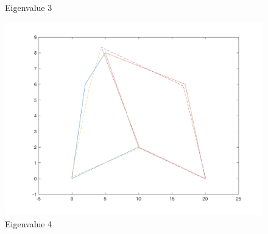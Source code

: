 \documentclass[11pt]{amsart}
\begin{document}
\begin{figure}[H]
\begin{minipage}[b]{0.5\linewidth}
    \caption{Eigenvalue 3} 
    \vspace{4ex}
  \end{minipage}%
  \begin{minipage}[b]{0.5\linewidth}
    \centering
    \includegraphics[width=.5\linewidth]{eigenvectors/eigenvector_4_fullint.png} 
    \caption{Eigenvalue 4} 
    \vspace{4ex}
  \end{minipage} 
\end{figure}
\end{document}

